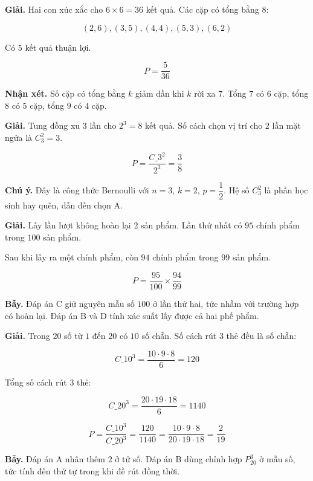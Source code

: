 \documentclass[11pt, a4paper]{article}
\begin{document}
\begin{dapan}[4 — Đáp án C]
\textbf{Giải.} Hai con xúc xắc cho $6 \times 6 = 36$ kết quả. Các cặp có tổng bằng $8$:

$$(2,6), (3,5), (4,4), (5,3), (6,2)$$

Có $5$ kết quả thuận lợi.

$$P = \frac{5}{36}$$

\textbf{Nhận xét.} Số cặp có tổng bằng $k$ giảm dần khi $k$ rời xa $7$. Tổng $7$ có $6$ cặp, tổng $8$ có $5$ cặp, tổng $9$ có $4$ cặp.
\end{dapan}

\begin{dapan}[5 — Đáp án B]
\textbf{Giải.} Tung đồng xu $3$ lần cho $2^3 = 8$ kết quả. Số cách chọn vị trí cho $2$ lần mặt ngửa là $C_3^2 = 3$.

$$P = \frac{C\_3^2}{2^3} = \frac{3}{8}$$

\textbf{Chú ý.} Đây là công thức Bernoulli với $n = 3$, $k = 2$, $p = \dfrac{1}{2}$. Hệ số $C_3^2$ là phần học sinh hay quên, dẫn đến chọn A.
\end{dapan}

\begin{dapan}[6 — Đáp án A]
\textbf{Giải.} Lấy lần lượt không hoàn lại $2$ sản phẩm. Lần thứ nhất có $95$ chính phẩm trong $100$ sản phẩm.

Sau khi lấy ra một chính phẩm, còn $94$ chính phẩm trong $99$ sản phẩm.

$$P = \frac{95}{100} \times \frac{94}{99}$$

\textbf{Bẫy.} Đáp án C giữ nguyên mẫu số $100$ ở lần thứ hai, tức nhầm với trường hợp có hoàn lại. Đáp án B và D tính xác suất lấy được cả hai phế phẩm.
\end{dapan}

\begin{dapan}[7 — Đáp án C]
\textbf{Giải.} Trong $20$ số từ $1$ đến $20$ có $10$ số chẵn. Số cách rút $3$ thẻ đều là số chẵn:

$$C\_{10}^3 = \frac{10 \cdot 9 \cdot 8}{6} = 120$$

Tổng số cách rút $3$ thẻ:

$$C\_{20}^3 = \frac{20 \cdot 19 \cdot 18}{6} = 1140$$

$$P = \frac{C\_{10}^3}{C\_{20}^3} = \frac{120}{1140} = \frac{10 \cdot 9 \cdot 8}{20 \cdot 19 \cdot 18} = \frac{2}{19}$$

\textbf{Bẫy.} Đáp án A nhân thêm $2$ ở tử số. Đáp án B dùng chỉnh hợp $P_{20}^3$ ở mẫu số, tức tính đến thứ tự trong khi đề rút đồng thời.
\end{dapan}
\end{document}
